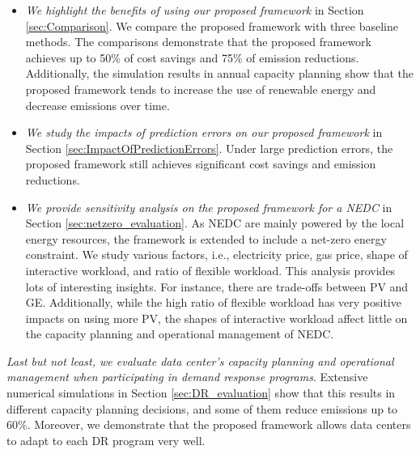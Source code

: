 \begin{itemize}
	\item \emph{We highlight the benefits of using our proposed framework} in Section \ref{sec:Comparison}. We compare the proposed framework with three baseline methods. The comparisons demonstrate that the proposed framework achieves up to 50\% of cost savings and 75\% of emission reductions. Additionally, the simulation results in annual capacity planning show that the proposed framework tends to increase the use of renewable energy and decrease emissions over time.
	
	
	\item \emph{We study the impacts of prediction errors on our proposed framework} in Section \ref{sec:ImpactOfPredictionErrors}. Under large prediction errors, the proposed framework still achieves significant cost savings and emission reductions. 
	
	
	\item \emph{We provide sensitivity analysis on the proposed framework for a NEDC} in Section \ref{sec:netzero_evaluation}. As NEDC are mainly powered by the local energy resources, the framework is extended to include a net-zero energy constraint. We study various factors, i.e., electricity price, gas price, shape of interactive workload, and ratio of flexible workload. This analysis provides lots of interesting insights. For instance, there are trade-offs between PV and GE. Additionally, while the high ratio of flexible workload has very positive impacts on using more PV, the shapes of interactive workload affect little on the capacity planning and operational management of NEDC. 
\end{itemize}

\emph{Last but not least, we evaluate data center's capacity planning and operational management when participating in demand response programs}. Extensive numerical simulations in Section \ref{sec:DR_evaluation} show that this results in different capacity planning decisions, and some of them reduce emissions up to 60\%. Moreover, we demonstrate that the proposed framework allows data centers to adapt to each DR program very well.